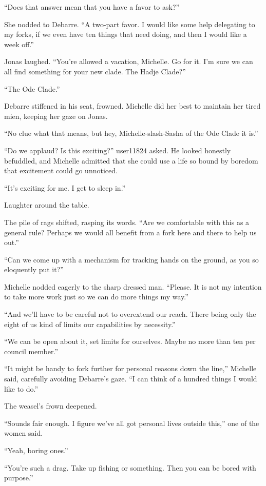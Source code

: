 ``Does that answer mean that you have a favor to ask?''

She nodded to Debarre. ``A two-part favor. I would like some help delegating to my forks, if we even have ten things that need doing, and then I would like a week off.''

Jonas laughed. ``You're allowed a vacation, Michelle. Go for it. I'm sure we can all find something for your new clade. The Hadje Clade?''

``The Ode Clade.''

Debarre stiffened in his seat, frowned. Michelle did her best to maintain her tired mien, keeping her gaze on Jonas.

``No clue what that means, but hey, Michelle-slash-Sasha of the Ode Clade it is.''

``Do we applaud? Is this exciting?'' user11824 asked. He looked honestly befuddled, and Michelle admitted that she could use a life so bound by boredom that excitement could go unnoticed.

``It's exciting for me. I get to sleep in.''

Laughter around the table.

The pile of rags shifted, rasping its words. ``Are we comfortable with this as a general rule? Perhaps we would all benefit from a fork here and there to help us out.''

``Can we come up with a mechanism for tracking hands on the ground, as you so eloquently put it?''

Michelle nodded eagerly to the sharp dressed man. ``Please. It is not my intention to take more work just so we can do more things my way.''

``And we'll have to be careful not to overextend our reach. There being only the eight of us kind of limits our capabilities by necessity.''

``We can be open about it, set limits for ourselves. Maybe no more than ten per council member.''

``It might be handy to fork further for personal reasons down the line,'' Michelle said, carefully avoiding Debarre's gaze. ``I can think of a hundred things I would like to do.''

The weasel's frown deepened.

``Sounds fair enough. I figure we've all got personal lives outside this,'' one of the women said.

``Yeah, boring ones.''

``You're such a drag. Take up fishing or something. Then you can be bored with purpose.''


